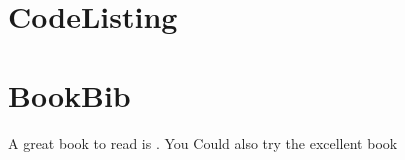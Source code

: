 \documentclass[a4paper]{article}
\begin{document}
    \section{CodeListing}
        
    
    \section{BookBib}
    A great book to read is \cite{lynch2008lies}. You Could also try the excellent book \cite{knuthwebsite} 


        
        
\end{document}
